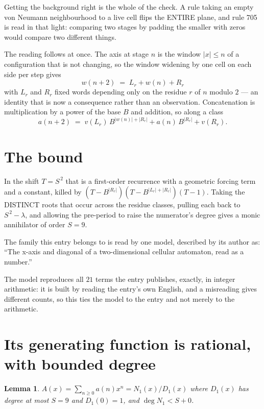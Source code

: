 \documentclass[11pt,a4paper]{article}
\theoremstyle{plain}
\newtheorem{lemma}[theorem]{Lemma}
\theoremstyle{definition}
\begin{document}
Getting the background right is the whole of the check. A rule taking an empty von Neumann
neighbourhood to a live cell flips the ENTIRE plane, and rule 705 is read
in that light: comparing two stages by padding the smaller with zeros would compare two
different things.

The reading follows at once. The axis at stage $n$ is the window $|x|\le n$ of a configuration
that is not changing, so the window widening by one cell on each side per step gives
\[
w(n+2)\;=\;L_r + w(n) + R_r
\]
with $L_r$ and $R_r$ fixed words depending only on the residue $r$ of $n$ modulo $2$ --- an
identity that is now a consequence rather than an observation. Concatenation is multiplication
by a power of the base $B$ and addition, so along a class
\[
a(n+2)\;=\;v(L_r)\,B^{|w(n)|+|R_r|} + a(n)\,B^{|R_r|} + v(R_r).
\]

\section{The bound}

In the shift $T=S^{\,2}$ that is a first-order recurrence with a geometric forcing term and a
constant, killed by $(T-B^{|R_r|})(T-B^{|L_r|+|R_r|})(T-1)$. Taking the DISTINCT roots that
occur across the residue classes, pulling each back to $S^{\,2}-\lambda$, and allowing the
pre-period to raise the numerator's degree gives a monic annihilator of order $S=9$.

The family this entry belongs to is read by one model, described by its author as: ``The x-axis and diagonal of a two-dimensional cellular automaton, read as a number.''


The model reproduces all $21$ terms the entry publishes, exactly, in integer arithmetic:
it is built by reading the entry's own English, and a misreading gives different counts, so
this ties the model to the entry and not merely to the arithmetic.

\section{Its generating function is rational, with bounded degree}

\begin{lemma}\label{lem:rat}
$A(x)=\sum_{n\ge0}a(n)x^n=N_1(x)/D_1(x)$ where $D_1(x)$ has degree at most $S=9$ and
$D_1(0)=1$, and $\deg N_1<S+0$.
\end{lemma}
\end{document}
